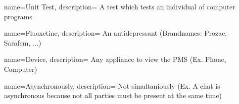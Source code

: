 {  
    name={Unit Test},
    description={
        A test which tests an individual of computer programs
    }
}

{  
    name={Fluoxetine},
    description={
        An antidepressant (Brandnames: Prozac, Sarafem, ...)
    }
}

{  
    name={Device},
    description={
      Any appliance to view the PMS (Ex. Phone, Computer)
    }
}

{  
    name={Asynchronously},
    description={
      Not simultaniously (Ex. A chat is asynchronous because not all parties must be present at the same time)
    }
}
